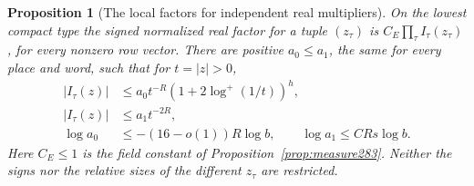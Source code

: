 \documentclass[a4paper,11pt]{article}
\newtheorem{proposition}{Proposition}[section]
\theoremstyle{definition}
\theoremstyle{remark}
\numberwithin{equation}{section}
\begin{document}
\begin{proposition}[The local factors for independent real multipliers]\leavevmode
\label{prop:places288}
On the lowest compact type the signed normalized real factor
for a tuple \((z_\tau)\) is \(C_E\prod_\tau I_\tau(z_\tau)\),
for every nonzero row vector. There are positive
\(a_0\le a_1\), the same for every place and word, such that
for \(t=|z|>0\),
\[
 \begin{split}
 |I_\tau(z)|&\le a_0 t^{-R}
              (1+2\log^+(1/t))^h,\\
 |I_\tau(z)|&\le a_1 t^{-2R},\\
 \log a_0&\le -(16-o(1))R\log b,\qquad
 \log a_1\le C R s\log b .
 \end{split}
\]
Here \(C_E\le1\) is the field constant of
Proposition~\ref{prop:measure283}. Neither the signs nor the
relative sizes of the different \(z_\tau\) are restricted.
\end{proposition}
\end{document}
